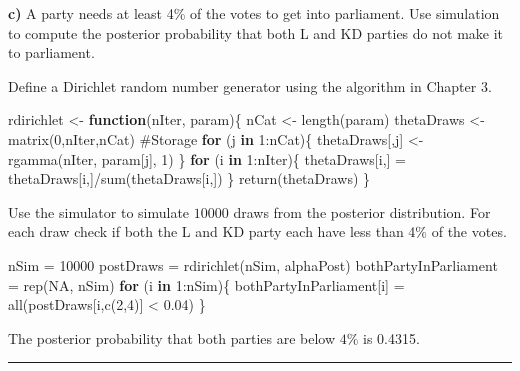 \documentclass[
  letterpaper,
  DIV=11,
  numbers=noendperiod]{scrartcl}
\newenvironment{Shaded}{\begin{snugshade}}{\end{snugshade}}
\newcommand{\CommentTok}[1]{\textcolor[rgb]{0.37,0.37,0.37}{#1}}
\newcommand{\ConstantTok}[1]{\textcolor[rgb]{0.56,0.35,0.01}{#1}}
\newcommand{\ControlFlowTok}[1]{\textcolor[rgb]{0.00,0.23,0.31}{\textbf{#1}}}
\newcommand{\DecValTok}[1]{\textcolor[rgb]{0.68,0.00,0.00}{#1}}
\newcommand{\FloatTok}[1]{\textcolor[rgb]{0.68,0.00,0.00}{#1}}
\newcommand{\FunctionTok}[1]{\textcolor[rgb]{0.28,0.35,0.67}{#1}}
\newcommand{\NormalTok}[1]{\textcolor[rgb]{0.00,0.23,0.31}{#1}}
\newcommand{\OtherTok}[1]{\textcolor[rgb]{0.00,0.23,0.31}{#1}}
\newcommand{\SpecialCharTok}[1]{\textcolor[rgb]{0.37,0.37,0.37}{#1}}
\begin{document}
\textbf{c)} A party needs at least 4\% of the votes to get into
parliament. Use simulation to compute the posterior probability that
both L and KD parties do not make it to parliament.

\begin{tcolorbox}[enhanced jigsaw, title={Solution}, bottomtitle=1mm, opacityback=0, colback=white, colbacktitle=quarto-callout-note-color!10!white, breakable, left=2mm, colframe=quarto-callout-note-color-frame, coltitle=black, bottomrule=.15mm, leftrule=.75mm, toptitle=1mm, titlerule=0mm, arc=.35mm, rightrule=.15mm, opacitybacktitle=0.6, toprule=.15mm]

Define a Dirichlet random number generator using the algorithm in
Chapter 3.

\begin{Shaded}
\begin{Highlighting}[]
\NormalTok{rdirichlet }\OtherTok{\textless{}{-}} \ControlFlowTok{function}\NormalTok{(nIter, param)\{}
\NormalTok{  nCat }\OtherTok{\textless{}{-}} \FunctionTok{length}\NormalTok{(param)}
\NormalTok{  thetaDraws }\OtherTok{\textless{}{-}} \FunctionTok{matrix}\NormalTok{(}\DecValTok{0}\NormalTok{,nIter,nCat) }\CommentTok{\#Storage}
  \ControlFlowTok{for}\NormalTok{ (j }\ControlFlowTok{in} \DecValTok{1}\SpecialCharTok{:}\NormalTok{nCat)\{}
\NormalTok{    thetaDraws[,j] }\OtherTok{\textless{}{-}} \FunctionTok{rgamma}\NormalTok{(nIter, param[j], }\DecValTok{1}\NormalTok{)}
\NormalTok{  \}}
  \ControlFlowTok{for}\NormalTok{ (i }\ControlFlowTok{in} \DecValTok{1}\SpecialCharTok{:}\NormalTok{nIter)\{}
\NormalTok{    thetaDraws[i,] }\OtherTok{=}\NormalTok{ thetaDraws[i,]}\SpecialCharTok{/}\FunctionTok{sum}\NormalTok{(thetaDraws[i,])}
\NormalTok{  \}}
  \FunctionTok{return}\NormalTok{(thetaDraws)}
\NormalTok{\}}
\end{Highlighting}
\end{Shaded}

Use the simulator to simulate \(10000\) draws from the posterior
distribution. For each draw check if both the L and KD party each have
less than 4\% of the votes.

\begin{Shaded}
\begin{Highlighting}[]
\NormalTok{nSim }\OtherTok{=} \DecValTok{10000}
\NormalTok{postDraws }\OtherTok{=} \FunctionTok{rdirichlet}\NormalTok{(nSim, alphaPost)}
\NormalTok{bothPartyInParliament }\OtherTok{=} \FunctionTok{rep}\NormalTok{(}\ConstantTok{NA}\NormalTok{, nSim)}
\ControlFlowTok{for}\NormalTok{ (i }\ControlFlowTok{in} \DecValTok{1}\SpecialCharTok{:}\NormalTok{nSim)\{}
\NormalTok{  bothPartyInParliament[i] }\OtherTok{=} \FunctionTok{all}\NormalTok{(postDraws[i,}\FunctionTok{c}\NormalTok{(}\DecValTok{2}\NormalTok{,}\DecValTok{4}\NormalTok{)] }\SpecialCharTok{\textless{}} \FloatTok{0.04}\NormalTok{)}
\NormalTok{\}}
\end{Highlighting}
\end{Shaded}

The posterior probability that both parties are below \(4\%\) is 0.4315.

\end{tcolorbox}

\begin{center}\rule{0.5\linewidth}{0.5pt}\end{center}
\end{document}
